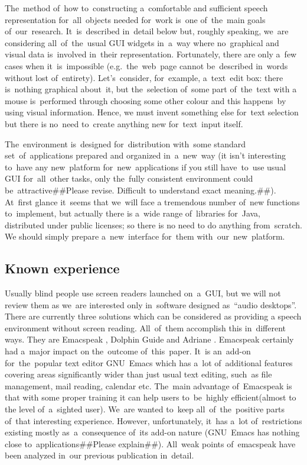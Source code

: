 \documentclass{acm_proc_article-sp}
\begin{document}
The~method of~how to~constructing a~comfortable and sufficient speech representation for~all~objects needed for~work
is~one of~the~main goals of~our~research.
It~is~described in~detail below but, roughly speaking,
we~are considering all~of~the~usual GUI widgets  in~a~way where no~graphical and visual data is~involved in~their representation.
Fortunately, there are only a~few cases when it~is~impossible (e.g.~the~web~page cannot be~described in~words without lost of~entirety).
Let's~consider, for~example, a~text~edit box: 
there is~nothing graphical about~it, 
but the~selection of~some part of~the~text with a mouse is~performed through choosing some other colour 
and this happens~by using visual information.
Hence, we must invent something else for~text selection but there is no~need to~create anything new for~text~input itself.

The~environment is~designed for~distribution with~some standard set~of~applications 
prepared and organized in~a~new~way
(it isn't interesting to~have any new~platform for~new~applications
if you still have~to~use usual GUI for~all~other tasks, 
only the~fully consistent environment could be~attractive##Please revise. Difficult to understand exact meaning.##).
At~first glance it~seems that we~will face a tremendous number of~new functions to~implement, 
but actually there is a~wide range of~libraries for~Java, distributed under public licenses;
so there is no need to do anything from~scratch.
We should simply prepare a~new~interface for~them with~our~new~platform.

\subsection{Known experience}

Usually blind people use screen readers launched on~a~GUI, 
but we will not review them as we~are interested only in~software designed as~``audio desktops''.
There are currently three solutions which can be considered as providing a speech environment without screen reading.
All~of~them accomplish this in~different ways.
They are Emacspeak \cite{emacspeak}, 
Dolphin Guide \cite{dolphineguide} and 
Adriane \cite{adriane}. 
Emacspeak certainly had a~major impact on the~outcome of~this~paper.
It~is an~add-on for~the~popular text editor GNU~Emacs \cite{emacs}
which has a~lot of~additional features covering areas significantly wider than just usual text editing, 
such~as file management, mail reading, calendar etc. 
The~main advantage of~Emacspeak is that with some proper training 
it can help users to~be~highly efficient(almost to the level of~a~sighted user).
We~are wanted to~keep all~of~the~positive parts of~that interesting experience.
However, unfortunately, it~has a~lot of~restrictions 
existing mostly as~a~consequence of~its add-on nature 
(GNU~Emacs has nothing close to~applications##Please explain##). 
All~weak points  of~emacspeak have been analyzed  in~our previous publication \cite{luwrain1} in~detail.
\end{document}
